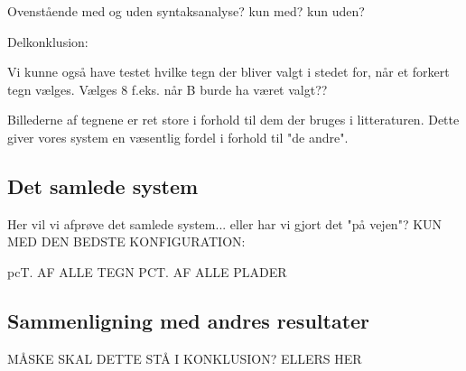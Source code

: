 Ovenstående med og uden syntaksanalyse? kun med? kun uden?


Delkonklusion:

Vi kunne også have testet hvilke tegn der bliver valgt i stedet for, når et forkert tegn vælges. Vælges 8 f.eks. når B burde ha været valgt??

Billederne af tegnene er ret store i forhold til dem der bruges i litteraturen. Dette giver vores system en væsentlig fordel i forhold til "de andre".

\subsection{Det samlede system}

Her vil vi afprøve det samlede system... eller har vi gjort det "på vejen"?
KUN MED DEN BEDSTE KONFIGURATION:

pcT. AF ALLE TEGN
PCT. AF ALLE PLADER

\subsection{Sammenligning med andres resultater}

MÅSKE SKAL DETTE STÅ I KONKLUSION? ELLERS HER
